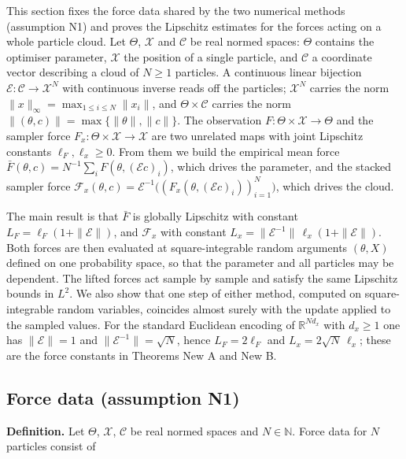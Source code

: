 \documentclass[11pt,a4paper]{report}
\begin{document}
This section fixes the force data shared by the two numerical methods (assumption N1) and proves the Lipschitz estimates for the forces acting on a whole particle cloud. Let \(\Theta\), \(\mathcal X\) and \(\mathcal C\) be real normed spaces: \(\Theta\) contains the optimiser parameter, \(\mathcal X\) the position of a single particle, and \(\mathcal C\) a coordinate vector describing a cloud of \(N\ge1\) particles. A continuous linear bijection \(\mathcal E:\mathcal C\to\mathcal X^N\) with continuous inverse reads off the particles; \(\mathcal X^N\) carries the norm \(\|x\|_\infty=\max_{1\le i\le N}\|x_i\|\), and \(\Theta\times\mathcal C\) carries the norm \(\|(\theta,c)\|=\max\{\|\theta\|,\|c\|\}\). The observation \(F:\Theta\times\mathcal X\to\Theta\) and the sampler force \(F_x:\Theta\times\mathcal X\to\mathcal X\) are two unrelated maps with joint Lipschitz constants \(\ell_F,\ell_x\ge0\). From them we build the empirical mean force \(\bar F(\theta,c)=N^{-1}\sum_iF(\theta,(\mathcal Ec)_i)\), which drives the parameter, and the stacked sampler force \(\mathcal F_x(\theta,c)=\mathcal E^{-1}\bigl((F_x(\theta,(\mathcal Ec)_i))_{i=1}^N\bigr)\), which drives the cloud.




The main result is that \(\bar F\) is globally Lipschitz with constant \(L_F=\ell_F(1+\|\mathcal E\|)\), and \(\mathcal F_x\) with constant \(L_x=\|\mathcal E^{-1}\|\,\ell_x(1+\|\mathcal E\|)\). Both forces are then evaluated at square-integrable random arguments \((\theta,X)\) defined on one probability space, so that the parameter and all particles may be dependent. The lifted forces act sample by sample and satisfy the same Lipschitz bounds in \(L^2\). We also show that one step of either method, computed on square-integrable random variables, coincides almost surely with the update applied to the sampled values. For the standard Euclidean encoding of \(\mathbb R^{Nd_x}\) with \(d_x\ge1\) one has \(\|\mathcal E\|=1\) and \(\|\mathcal E^{-1}\|=\sqrt N\), hence \(L_F=2\ell_F\) and \(L_x=2\sqrt N\,\ell_x\); these are the force constants in Theorems New A and New B.

\subsection{\texorpdfstring{Force data (assumption N1)}{Force data (assumption N1)}}


\textbf{Definition.} Let \(\Theta\), \(\mathcal X\), \(\mathcal C\) be real normed spaces and \(N\in\mathbb N\). Force data for \(N\) particles consist of
\end{document}
